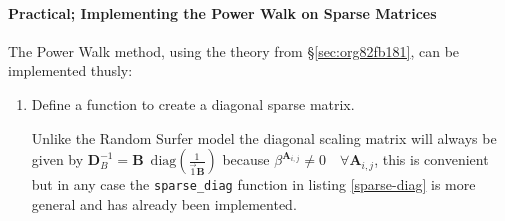 \documentclass[11pt, twoside]{report}
\begin{document}
\paragraph{Practical; Implementing the Power Walk on Sparse Matrices}
The Power Walk method, using the theory from \S \ref{sec:org82fb181}, can be implemented thusly:
\label{sec:org3a8ba15}
\begin{enumerate}
\item Define a function to create a diagonal sparse matrix.
\label{sec:org74d4373}

Unlike the Random Surfer model the diagonal scaling matrix will always be given by  \(\mathbf{D}_{B}^{-1} = \mathbf{B} \enspace \mathrm{diag}\left( \frac{1}{\vec{1}\mathbf{B}}\right)\) because \(\beta^{\mathbf{A}_{i,j}} \neq 0 \quad \forall \mathbf{A}_{i,j}\), this is convenient but in any case the \texttt{sparse\_diag} function in listing \ref{sparse-diag} is more general and has already been implemented.
\end{enumerate}
\end{document}
